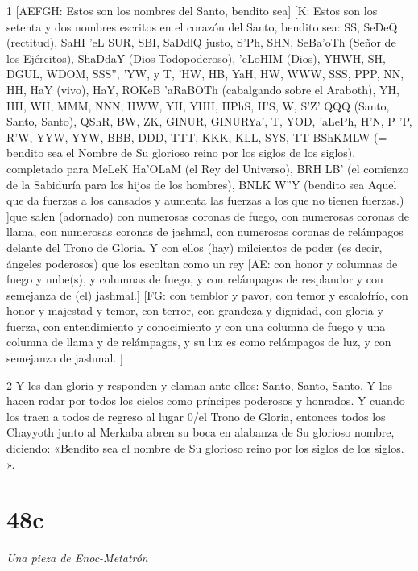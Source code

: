 \par 1 [AEFGH: Estos son los nombres del Santo, bendito sea] [K: Estos son los setenta y dos nombres escritos en el corazón del Santo, bendito sea: SS, SeDeQ (rectitud), SaHI 'eL SUR, SBI, SaDdlQ {justo}, S'Ph, SHN, SeBa'oTh (Señor de los Ejércitos), ShaDdaY (Dios Todopoderoso), 'eLoHIM (Dios), YHWH, SH, DGUL, WDOM, SSS'', 'YW, y T, 'HW, HB, YaH, HW, WWW, SSS, PPP, NN, HH, HaY (vivo), HaY, ROKeB 'aRaBOTh (cabalgando sobre el Araboth), YH, HH, WH, MMM, NNN, HWW, YH, YHH, HPhS, H'S, W, S'Z' QQQ (Santo, Santo, Santo), QShR, BW, ZK, GINUR, GINURYa', T, YOD, 'aLePh, H'N, P 'P, R'W, YYW, YYW, BBB, DDD, TTT, KKK, KLL, SYS, TT BShKMLW (= bendito sea el Nombre de Su glorioso reino por los siglos de los siglos), completado para MeLeK Ha'OLaM (el Rey del Universo), BRH LB' (el comienzo de la Sabiduría para los hijos de los hombres), BNLK W''Y (bendito sea Aquel que da fuerzas a los cansados ​​y aumenta las fuerzas a los que no tienen fuerzas.) ]que salen (adornado) con numerosas coronas de fuego, con numerosas coronas de llama, con numerosas coronas de jashmal, con numerosas coronas de relámpagos delante del Trono de Gloria. Y con ellos (hay) milcientos de poder (es decir, ángeles poderosos) que los escoltan como un rey [AE: con honor y columnas de fuego y nube(s), y columnas de fuego, y con relámpagos de resplandor y con semejanza de (el) jashmal.] [FG: con temblor y pavor, con temor y escalofrío, con honor y majestad y temor, con terror, con grandeza y dignidad, con gloria y fuerza, con entendimiento y conocimiento y con una columna de fuego y una columna de llama y de relámpagos, y su luz es como relámpagos de luz, y con semejanza de jashmal. ]

\par 2 Y les dan gloria y responden y claman ante ellos: Santo, Santo, Santo. Y los hacen rodar por todos los cielos como príncipes poderosos y honrados. Y cuando los traen a todos de regreso al lugar 0/el Trono de Gloria, entonces todos los Chayyoth junto al Merkaba abren su boca en alabanza de Su glorioso nombre, diciendo: «Bendito sea el nombre de Su glorioso reino por los siglos de los siglos. ».



\chapter{48c}

\par \textit{Una pieza de Enoc-Metatrón}

